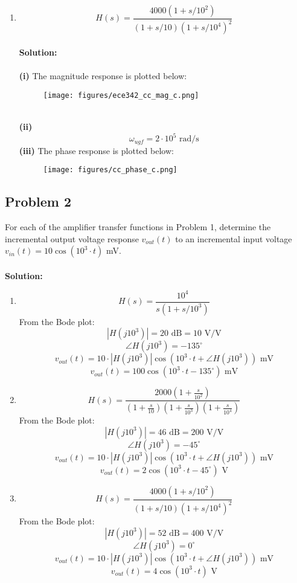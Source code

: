 \documentclass{article}
\begin{document}
\begin{enumerate}[label=\textbf{(\alph*)}]
    \newpage
    \item $$H(s) = \frac{4000(1+s/10^2)}{(1+s/10)(1+s/10^4)^2}$$
    \\ \textbf{Solution:}\\ \\
    \textbf{(i)} The magnitude response is plotted below:
    \begin{figure}[!h]
    \centering
    \texttt{[image: figures/ece342\_cc\_mag\_c.png]}
    \end{figure} \\
    \textbf{(ii)} 
    $$\boxed{\omega_{ugf} = 2 \cdot 10^5 \text{ rad/s}}$$
    \newpage
    \textbf{(iii)} The phase response is plotted below:
    \begin{figure}[!h]
    \centering
    \texttt{[image: figures/cc\_phase\_c.png]}
    \end{figure}
\end{enumerate}
\newpage
\subsection*{Problem 2}
For each of the amplifier transfer functions in Problem 1, determine the incremental output voltage response $v_{out}(t)$ to an incremental input voltage $v_{in}(t) = 10\cos(10^3 \cdot t)$ mV. \\ \\
\textbf{Solution:} \\
\begin{enumerate}[label=\textbf{(\alph*)}]
\item $$H(s) = \frac{10^4}{s(1+s/10^3)}$$
From the Bode plot:
$$|H(j10^3)| = 20\text{ dB} = 10\text{ V/V}$$
$$\angle H(j10^3) = -135^{\circ}$$
$$v_{out}(t) = 10\cdot |H(j10^3)| \cos(10^3 \cdot t + \angle H(j10^3))\text{ mV}$$
$$\boxed{v_{out}(t) = 100 \cos(10^3 \cdot t -135^{\circ})\text{ mV}}$$
\item $$H(s) = \frac{2000\left(1 + \frac{s}{10^2}\right)}{\left(1 + \frac{s}{10}\right)\left(1 + \frac{s}{10^3}\right)\left(1 + \frac{s}{10^4}\right)}$$
From the Bode plot: 
$$|H(j10^3)| = 46\text{ dB} = 200\text{ V/V}$$
$$\angle H(j10^3) = -45^{\circ}$$
$$v_{out}(t) = 10\cdot |H(j10^3)| \cos(10^3 \cdot t + \angle H(j10^3))\text{ mV}$$
$$\boxed{v_{out}(t) = 2 \cos(10^3 \cdot t -45^{\circ})\text{ V}}$$
\item $$H(s) = \frac{4000(1+s/10^2)}{(1+s/10)(1+s/10^4)^2}$$
From the Bode plot: 
$$|H(j10^3)| = 52\text{ dB} = 400\text{ V/V}$$
$$\angle H(j10^3) = 0^{\circ}$$
$$v_{out}(t) = 10\cdot |H(j10^3)| \cos(10^3 \cdot t + \angle H(j10^3))\text{ mV}$$
$$\boxed{v_{out}(t) = 4 \cos(10^3 \cdot t)\text{ V}}$$
\end{enumerate}
\newpage
\end{document}
